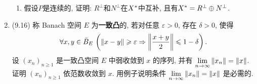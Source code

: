 \begin{enumerate}[label=\textbf{\arabic*.}, ref=\arabic*]
\begin{enumerate}[(1)]
			\item 假设$ P $是连续的, 证明: $ R^\bot $和$ N^\bot $在$ X^{*} $中互补, 且有$ X^{*}=R^\bot\oplus N^\bot $.
		\end{enumerate}
		\item (9.16) 称 Banach 空间 $ E $ 为\textbf{一致凸}的, 若对任意 $ \varepsilon>0 $, 存在 $ \delta>0 $, 使得
		\[
			\forall x, y\in\bar{B}_{E}\,\left(\left\| x-y \right\|\geqslant\varepsilon\Rightarrow \left\| \frac{x+y}{2} \right\|\leqslant 1-\delta\right).
		\]
		设 $ (x_{n})_{n\geqslant1} $ 是一致凸空间 $ E $ 中弱收敛到 $ x $ 的序列, 并有 $ \lim\limits_{n\to\infty}\left\| x_{n} \right\|=\left\| x \right\| $. 证明 $ (x_{n})_{n\geqslant1} $ 依范数收敛到 $ x $. 用例子说明条件 $ \lim\limits_{n\to\infty}\left\| x_{n} \right\|=\left\| x \right\| $ 是必需的.
	\end{enumerate}